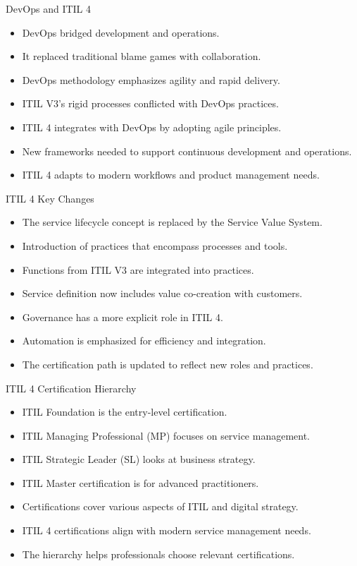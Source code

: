 \documentclass[aspectratio=169, table]{beamer}
\begin{document}
\begin{frame}{DevOps and ITIL 4}
	\begin{itemize}
		\item DevOps bridged development and operations.
		\item It replaced traditional blame games with collaboration.
		\item DevOps methodology emphasizes agility and rapid delivery.
		\item ITIL V3's rigid processes conflicted with DevOps practices.
		\item ITIL 4 integrates with DevOps by adopting agile principles.
		\item New frameworks needed to support continuous development and operations.
		\item ITIL 4 adapts to modern workflows and product management needs.
	\end{itemize}
\end{frame}

\begin{frame}{ITIL 4 Key Changes}
	\begin{itemize}
		\item The service lifecycle concept is replaced by the Service Value System.
		\item Introduction of practices that encompass processes and tools.
		\item Functions from ITIL V3 are integrated into practices.
		\item Service definition now includes value co-creation with customers.
		\item Governance has a more explicit role in ITIL 4.
		\item Automation is emphasized for efficiency and integration.
		\item The certification path is updated to reflect new roles and practices.
	\end{itemize}
\end{frame}

\begin{frame}{ITIL 4 Certification Hierarchy}
	\begin{itemize}
		\item ITIL Foundation is the entry-level certification.
		\item ITIL Managing Professional (MP) focuses on service management.
		\item ITIL Strategic Leader (SL) looks at business strategy.
		\item ITIL Master certification is for advanced practitioners.
		\item Certifications cover various aspects of ITIL and digital strategy.
		\item ITIL 4 certifications align with modern service management needs.
		\item The hierarchy helps professionals choose relevant certifications.
	\end{itemize}
\end{frame}
\end{document}
